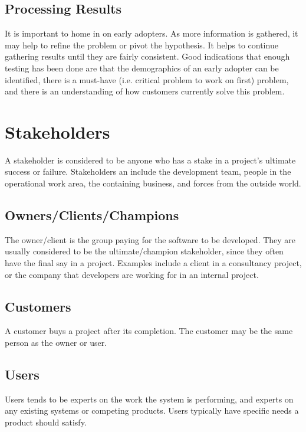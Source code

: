 \documentclass[12pt,titlepage]{article}
\let\stdsection\section
\renewcommand\section{\clearpage\stdsection}
\begin{document}
    \subsection{Processing Results}
      It is important to home in on early adopters. As more information is gathered, it may help to refine the problem or pivot the hypothesis.
      It helps to continue gathering results until they are fairly consistent. Good indications that enough testing has been done are that
      the demographics of an early adopter can be identified, there is a must-have (i.e. critical problem to work on first) problem, and there is
      an understanding of how customers currently solve this problem.

  \section{Stakeholders}
    A stakeholder is considered to be anyone who has a stake in a project's ultimate success or failure. Stakeholders an include the development
    team, people in the operational work area, the containing business, and forces from the outside world.

    \subsection{Owners/Clients/Champions}
      The owner/client is the group paying for the software to be developed. They are usually considered to be the ultimate/champion stakeholder,
      since they often have the final say in a project. Examples include a client in a consultancy project, or the company that developers are working
      for in an internal project.

    \subsection{Customers}
      A customer buys a project after its completion. The customer may be the same person as the owner or user.

    \subsection{Users}
      Users tends to be experts on the work the system is performing, and experts on any existing systems or competing products. Users typically
      have specific needs a product should satisfy.
\end{document}
